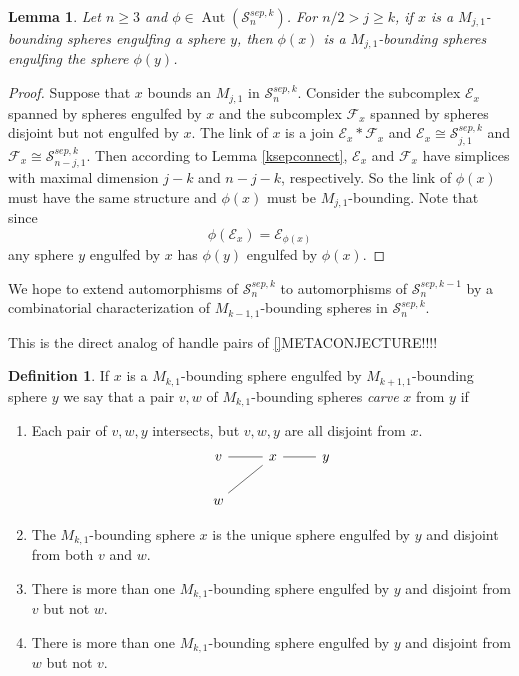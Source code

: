 \documentclass[11pt]{article}
\DeclareMathOperator{\aaut}{Aut}
\newtheorem{lemma}[theorem]{Lemma}
\theoremstyle{remark}
\theoremstyle{definition}
\newtheorem{definition}[theorem]{Definition}
\begin{document}
\begin{lemma}
Let $n\geq 3$ and $\phi \in \aaut{ \left ( \mathcal S^{sep,k}_{n} \right ) }$.
For $n/2>j\geq k$,
if $x$ is a
$M_{j,1}$-bounding spheres
engulfing a sphere $y$,
then $\phi(x)$
is a
$M_{j,1}$-bounding spheres
engulfing the sphere $\phi(y)$.
\label{kengulfschar}
\end{lemma}

\begin{proof}
  Suppose that $x$ bounds an $M_{j,1}$ in $\mathcal S^{sep,k}_{n}$.
  Consider the subcomplex
  $\mathcal E_x$ spanned by spheres engulfed by $x$
  and the subcomplex
  $\mathcal F_x$ spanned by spheres disjoint but not engulfed by $x$.
  The link of $x$ is a join $\mathcal E_x \ast \mathcal F_x$
  and
  $\mathcal E_x \cong \mathcal S^{sep,k}_{j,1}$
  and $\mathcal F_x \cong \mathcal S^{sep,k}_{n-j,1}$.
  Then according to Lemma \ref{ksepconnect},
  $\mathcal E_x$
  and $\mathcal F_x$
  have simplices with maximal dimension
  $j-k$ and $n-j-k$, respectively.
  So the link of $\phi(x)$ must have the same structure
  and $\phi(x)$ must be $M_{j,1}$-bounding.
  Note that since
  $$\phi \left( \mathcal E_x \right) =\mathcal E_{\phi(x)}$$
  any sphere $y$ engulfed by $x$ has $\phi(y)$ engulfed by $\phi(x)$.
\end{proof}

We hope to extend automorphisms of
$\mathcal S^{sep,k}_{n}$ to
automorphisms of $\mathcal S^{sep,k-1}_{n}$
by
a
combinatorial characterization of
$M_{k-1,1}$-bounding spheres in $\mathcal S^{sep,k}_{n}$.

This is the direct analog of handle pairs of \ref{}METACONJECTURE!!!!
\begin{definition}
  If $x$ is a $M_{k,1}$-bounding sphere engulfed by $M_{k+1,1}$-bounding sphere $y$
  we say that a pair $v,w$ of $M_{k,1}$-bounding spheres
  \emph{carve} $x$ from $y$ if
  \begin{enumerate}[(1)]
    \item Each pair of $v,w,y$ intersects, but $v,w,y$ are all disjoint from $x$.
    $$
    \begin{tikzcd}[every arrow/.append style={dash}]
      v \arrow{r} & x \arrow{r} & y\\
      w \arrow{ur} &&
    \end{tikzcd}
    $$
    \item The $M_{k,1}$-bounding sphere $x$ is the unique sphere engulfed by $y$
    and disjoint from both $v$ and $w$.
    \item There is more than one $M_{k,1}$-bounding sphere engulfed by $y$ and disjoint
    from $v$ but not $w$.
    \item There is more than one $M_{k,1}$-bounding sphere engulfed by $y$ and disjoint
    from $w$ but not $v$.
  \end{enumerate}
\end{definition}
\end{document}
